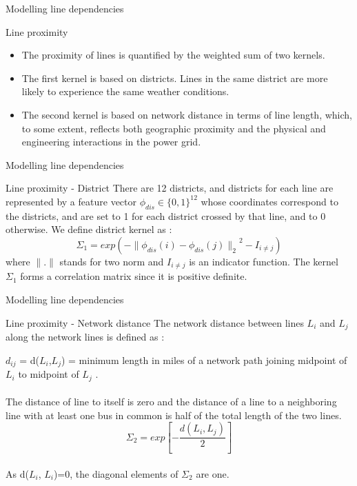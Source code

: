 \documentclass{beamer}
\begin{document}
 
  \begin{frame}{Modelling line dependencies}
\begin{block}{Line proximity}
\begin{itemize}
    \item The proximity of lines is quantified by the weighted sum of
two kernels.
     \item The first
kernel is based on districts. Lines in the same district are more
likely to experience the same weather conditions.
  \item The second kernel
is based on network distance in terms of line length, which, to
some extent, reflects both geographic proximity and the physical
and engineering interactions in the power grid.
\end{itemize}
\end{block}
\end{frame}    
 
  \begin{frame}{Modelling line dependencies}
\begin{block}{Line proximity - District}
There are 12 districts, and districts for each
line are represented by a feature vector $\phi_{dis} \in \{0, 1\}^{12}$ whose
coordinates correspond to the districts, and are set to 1 for each
district crossed by that line, and to 0 otherwise.
We define district kernel as :
\begin{equation}
     \Sigma_1 = exp(-{\parallel \phi_{dis}(i) - \phi_{dis}(j)\parallel_2}^2 - I_{i \neq j}) 
 \end{equation}
where $\parallel.\parallel$ stands for two norm and $I_{i \neq j}$ is an indicator function. The kernel $\Sigma_1 $ forms a correlation matrix since it is positive definite.

\end{block}
\end{frame}   
  
  
\begin{frame}{Modelling line dependencies}
\begin{block}{Line proximity - Network distance}
 The network distance between lines
$L_i$ and $L_j$ along the network lines is defined as :

$d_{ij}$ = d($L_{i}$,$L_{j}$) = minimum length in miles of a network path
joining midpoint of $L_i$ to midpoint of $L_j$ . \\
\\
The distance of line to itself is zero and the distance
of a line to a neighboring line with at least one bus in common
is half of the total length of the two lines.
\begin{equation}
     \Sigma_2 = exp[-\frac{d(L_i,L_j)}{2}] 
 \end{equation}
 \\
As d($L_i$, $L_i$)=0, the diagonal elements of $\Sigma_2$ are one.
\end{block}
\end{frame}  
 
\end{document}

